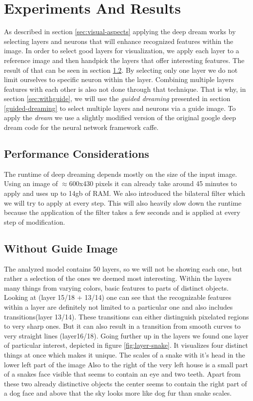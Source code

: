 \section{Experiments And Results}
\label{sec:evaluation}
As described in section \ref{sec:visual-aspects} applying the deep dream works by selecting layers and neurons that will enhance recognized features within the image.
In order to select good layers for visualization, we apply each layer to a reference image and then handpick the layers that offer interesting features. The result of that can be seen in section \ref{sec:withoutguide}.
By selecting only one layer we do not limit ourselves to specific neuron within the layer. Combining multiple layers features with each other is also not done through that technique. That is why, in section \ref{sec:withguide}, we will use the \emph{guided dreaming} presented in section \ref{guided-dreaming} to select multiple layers and neurons via a guide image.
To apply the \emph{dream} we use a slightly modified version of the original google deep dream code for the neural network framework caffe\cite{googledeepdream}.

\subsection{Performance Considerations}
The runtime of deep dreaming depends mostly on the size of the input image.
Using an image of $\approx$600x430 pixels it can already take around 45 minutes to apply and uses up to 14gb of RAM.
We also introduced the bilateral filter which we will try to apply at every step. This will also heavily slow down the runtime because the application of the filter takes a few seconds and is applied at every step of modification.
\subsection{Without Guide Image}
\label{sec:withoutguide}
The analyzed model contains 50 layers, so we will not be showing each one, but rather a selection of the ones we deemed most interesting.
Within the layers many things from varying colors, basic features to parts of distinct objects.
Looking at (layer 15/18 + 13/14) one can see that the recognizable features within a layer are definitely not limited to a particular one and also includes transitions(layer 13/14). These transitions can either distinguish pixelated regions to very sharp ones. But it can also result in a transition from smooth curves to very straight lines (layer16/18).
Going further up in the layers we found one layer of particular interest, depicted in figure \ref{fig:layer-snake}. It visualizes four distinct things at once which makes it unique. The scales of a snake with it's head in the lower left part of the image Also to the right of the very left house is a small part of a snakes face visible that seems to contain an eye and two teeth. Apart from these two already distinctive objects the center seems to contain the right part of a dog face and above that the sky looks more like dog fur than snake scales. 

